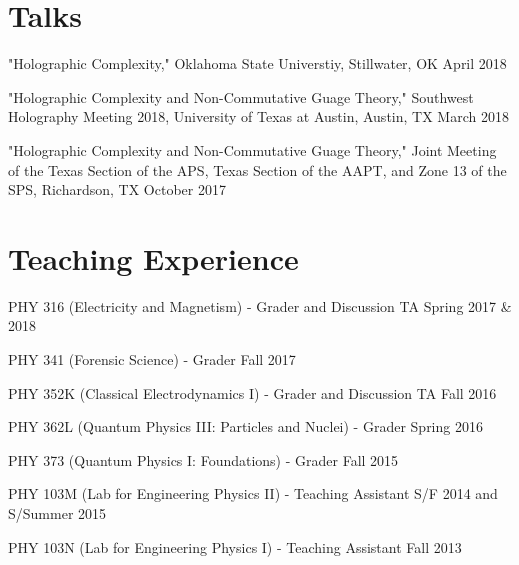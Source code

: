 \documentclass[letterpaper]{article}
\renewenvironment{itemize}{
  \begin{list}{}{
    \setlength{\leftmargin}{1.5em}
  }
}{
  \end{list}
}
\begin{document}
\section*{Talks}
\begin{itemize}

\item "Holographic Complexity," Oklahoma State Universtiy, Stillwater, OK \hfill April 2018

\item "Holographic Complexity and Non-Commutative Guage Theory," Southwest Holography Meeting 2018, University of Texas at Austin, Austin, TX \hfill March 2018

\item "Holographic Complexity and Non-Commutative Guage Theory," Joint Meeting of the Texas Section of the APS, Texas Section of the AAPT, and Zone 13 of the SPS, Richardson, TX \hfill October 2017

\end{itemize}

\section*{Teaching Experience}
\begin{itemize}

\item PHY 316 (Electricity and Magnetism) - Grader and Discussion TA \hfill Spring 2017 \& 2018

\item PHY 341 (Forensic Science) - Grader \hfill Fall 2017

\item PHY 352K (Classical Electrodynamics I) - Grader and Discussion TA \hfill Fall 2016

\item PHY 362L (Quantum Physics III: Particles and Nuclei) - Grader \hfill{Spring 2016}

\item PHY 373 (Quantum Physics I: Foundations) - Grader \hfill{Fall 2015}

\item PHY 103M (Lab for Engineering Physics II) - Teaching Assistant \hfill {S/F 2014 and S/Summer 2015}

\item PHY 103N (Lab for Engineering Physics I) - Teaching Assistant \hfill {Fall 2013}

\end{itemize}
\end{document}
